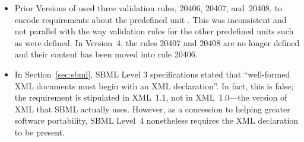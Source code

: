 \begin{blockChanged}
\begin{itemize}
\item Prior Versions of \sbmltwo used three validation rules,
  20406, 20407, and~20408, to encode requirements about the
  predefined unit .  This was inconsistent and not
  parallel with the way validation rules for the other predefined
  units such as  were defined.  In Version~4, the
  rules 20407 and 20408 are no longer defined and their content
  has been moved into rule 20406.


\item In Section~\ref{sec:sbml}, SBML Level 3 specifications
  stated that ``well-formed XML documents must begin with an XML
  declaration''.  In fact, this is false; the requirement is
  stipulated in XML~1.1, not in XML~1.0---the version of XML that
  SBML actually uses.  However, as a concession to helping greater
  software portability, SBML Level~4 nonetheless requires the XML
  declaration to be present.

\end{itemize}

\end{blockChanged}



\renewcommand{\thesubsection}{\Alph{section}.\arabic{subsection}}
